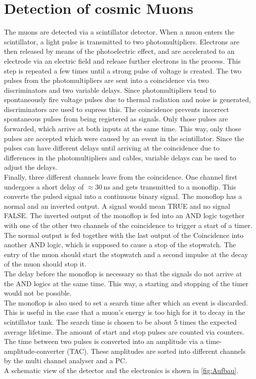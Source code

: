 \section{Detection of cosmic Muons}

The muons are detected via a scintillator detector. When a muon enters the scintillator, a light pulse is transmitted to two photomultipliers.
Electrons are then released by means of the photoelectric effect, 
and are accelerated to an electrode via an electric field and release further electrons in the process. This step is repeated a few times until a strong pulse of voltage is created.
The two pulses from the photomultipliers are sent into a coincidence via two discriminators and two variable delays. Since photomultipliers tend to spontaneously fire voltage pulses due to thermal radiation and noise is generated, discriminators
are used to supress this. The coincidence prevents incorrect spontaneous pulses from being registered as signals. Only those pulses are forwarded, which arrive at both inputs at the same time.
This way, only those pulses are accepted which were caused by an event in the scintillator. Since the pulses can have different delays until arriving at the coincidence due to differences in the photomultipliers and cables, variable delays 
can be used to adjust the delays.\\
Finally, three different channels leave from the coincidence. One channel first undergoes a short delay of $\approx \qty{30}{\nano\second}$ and gets transmitted to a monoflip. This converts the pulsed signal into a continuous binary signal.
The monoflop has a normal and an inverted output. A signal would mean TRUE and no signal FALSE. The inverted output of the monoflop is fed into an AND logic together with one of the other two channels of the coincidence to trigger a start of a timer.
The normal output is fed together with the last output of the Coincidence into another AND logic, which is supposed to cause a stop of the stopwatch.
The entry of the muon should start the stopwatch and a second impulse at the decay of the muon should stop it.\\
The delay before the monoflop is necessary so that the signals do not arrive at the AND logics at the same time. This way, a starting and stopping of the timer would not be possible.\\
The monoflop is also used to set a search time after which an event is discarded. This is useful in the case that a muon's energy is too high for it to decay in the scintillator tank. 
The search time is chosen to be about 5 times the expected average lifetime. The amount of start and stop pulses are counted via counters.\\
The time between two pulses is converted into an amplitude via a time-amplitude-converter (TAC). These amplitudes are sorted into different channels by the multi channel analyser and a PC.\\
A schematic view of the detector and the electronics is shown in \autoref{fig:Aufbau}.

